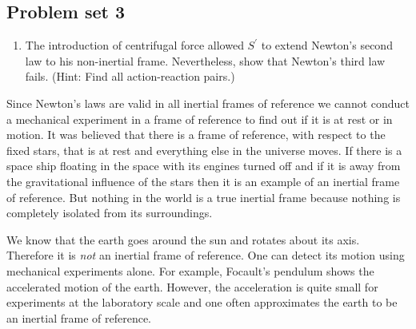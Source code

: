 \subsection{Problem set 3}\label{c1s1s3}
\begin{enumerate}
\item The introduction of centrifugal force allowed $S^\prime$ to extend
Newton's second law to his non-inertial frame. Nevertheless, show that Newton's
third law fails. (Hint: Find all action-reaction pairs.)
\end{enumerate}

Since Newton's laws are valid in all inertial frames of reference we cannot 
conduct a mechanical experiment in a frame of reference to find out if it is
at rest or in motion. It was believed that there is a frame of reference, with
respect to the fixed stars, that is at rest and everything else in the universe
moves. If there is a space ship floating in the space with its engines turned 
off and if it is away from the gravitational influence of the stars then it is 
an example of an inertial frame of reference. But nothing in the world is a true
inertial frame because nothing is completely isolated from its surroundings. 

We know that the earth goes around the sun and rotates about its axis. Therefore
it is \emph{not} an inertial frame of reference. One can detect its motion
using mechanical experiments alone. For example, Focault's pendulum shows the
accelerated motion of the earth. However, the acceleration is quite small for
experiments at the laboratory scale and one often approximates the earth to be
an inertial frame of reference.

